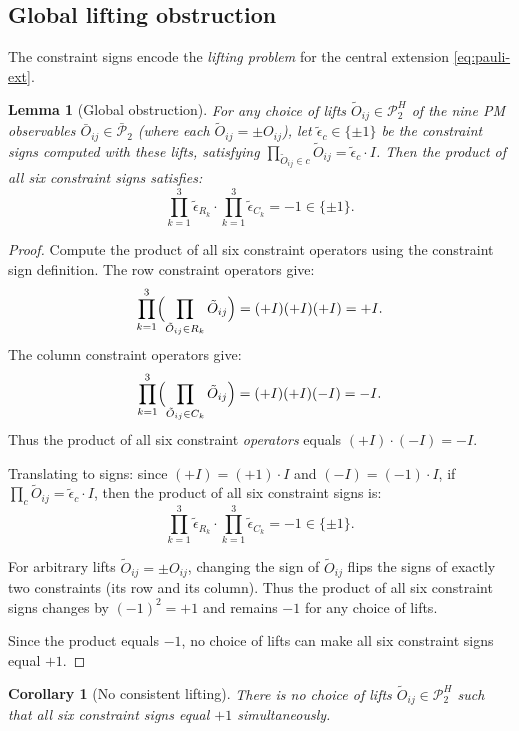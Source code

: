 \documentclass[11pt]{article}
\newtheorem{lemma}[theorem]{Lemma}
\newtheorem{corollary}[theorem]{Corollary}
\begin{document}
\subsection{Global lifting obstruction}

The constraint signs encode the \emph{lifting problem} for the central
extension \eqref{eq:pauli-ext}.

\begin{lemma}[Global obstruction]
\label{lem:global-obs}
For any choice of lifts $\tilde{O}_{ij} \in \mathcal{P}_2^H$ of the
nine PM observables $\bar{O}_{ij} \in \bar{\mathcal{P}}_2$ (where each
$\tilde{O}_{ij} = \pm O_{ij}$), let $\tilde{\epsilon}_c \in \{\pm 1\}$ be
the constraint signs computed with these lifts, satisfying
$\prod_{\tilde{O}_{ij} \in c} \tilde{O}_{ij} = \tilde{\epsilon}_c \cdot I$.
Then the product of all six constraint signs satisfies:
\begin{equation}
\label{eq:global-obs}
\prod_{k=1}^3 \tilde{\epsilon}_{R_k} \cdot \prod_{k=1}^3 \tilde{\epsilon}_{C_k}
= -1 \in \{\pm 1\}.
\end{equation}
\end{lemma}

\begin{proof}
Compute the product of all six constraint operators using the constraint sign definition.
The row constraint operators give:
\[
\prod_{k=1}^3 \Bigl(\prod_{\tilde{O}_{ij} \in R_k} \tilde{O}_{ij}\Bigr)
= (+I)(+I)(+I) = +I.
\]
The column constraint operators give:
\[
\prod_{k=1}^3 \Bigl(\prod_{\tilde{O}_{ij} \in C_k} \tilde{O}_{ij}\Bigr)
= (+I)(+I)(-I) = -I.
\]
Thus the product of all six constraint \emph{operators} equals $(+I) \cdot (-I) = -I$.

Translating to signs: since $(+I) = (+1) \cdot I$ and $(-I) = (-1) \cdot I$,
if $\prod_{c} \tilde{O}_{ij} = \tilde{\epsilon}_c \cdot I$,
then the product of all six constraint signs is:
\[
\prod_{k=1}^3 \tilde{\epsilon}_{R_k} \cdot \prod_{k=1}^3 \tilde{\epsilon}_{C_k}
= -1 \in \{\pm 1\}.
\]

For arbitrary lifts $\tilde{O}_{ij} = \pm O_{ij}$, changing the sign of
$\tilde{O}_{ij}$ flips the signs of exactly two constraints (its row and
its column). Thus the product of all six constraint signs changes by $(-1)^{2} = +1$
and remains $-1$ for any choice of lifts.

Since the product equals $-1$, no choice of lifts can make all six constraint signs equal $+1$.
\end{proof}

\begin{corollary}[No consistent lifting]
\label{cor:no-lifting}
There is no choice of lifts $\tilde{O}_{ij} \in \mathcal{P}_2^H$ such that
all six constraint signs equal $+1$ simultaneously.
\end{corollary}
\end{document}
